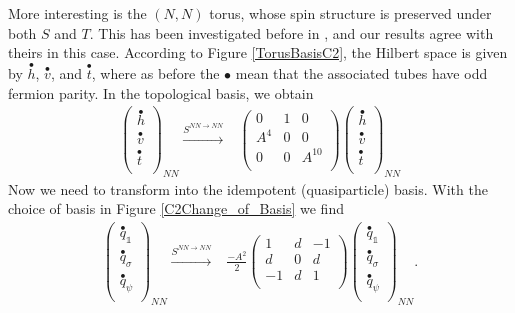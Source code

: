 \documentclass[12pt,a4paper]{article}
\newcounter{arrow}
\newcommand{\unit}{\mathds{1}}
\begin{document}
More interesting is the $(N,N)$ torus, whose spin structure is preserved under both $S$ and $T$. 
This has been investigated before in \cite{ware2016}, and our results agree with theirs in this case. 
According to Figure \ref{TorusBasisC2}, the Hilbert space is given by $\overset{\bullet}{h}$, $\overset{\bullet}{v}$, and $\overset{\bullet}{t}$,
where as before the $\bullet$ mean that the associated tubes have odd fermion parity.
In the topological basis, we obtain
\begin{align}
\left( \begin{matrix}
\overset{\bullet}{h}\\
\overset{\bullet}{v}\\
\overset{\bullet}{t}\\
\end{matrix} \right)_{NN} 
\xrightarrow{S^{NN \rightarrow NN}} & \left( \begin{matrix}
0&1&0\\
 A^4&0&0\\
0&0&A^{10}\\
\end{matrix} \right)
\left( \begin{matrix}
\overset{\bullet}{h}\\
\overset{\bullet}{v}\\
\overset{\bullet}{t}\\
\end{matrix} \right)_{NN}
\end{align}
Now we need to transform into the idempotent (quasiparticle) basis. 
With the choice of basis in Figure \ref{C2Change_of_Basis} we find
\begin{align}
\left( \begin{matrix}
\overset{\bullet}{q}_\unit\\
\overset{\bullet}{q}_\sigma\\
\overset{\bullet}{q}_\psi\\
\end{matrix} \right)_{NN} 
\xrightarrow{S^{NN \rightarrow NN}} &\frac{-A^2}{2} \left( \begin{matrix}
1& d&-1\\
d&0&d\\
-1& d&1\\
\end{matrix} \right)
\left( \begin{matrix}
\overset{\bullet}{q}_\unit\\
\overset{\bullet}{q}_\sigma\\
\overset{\bullet}{q}_\psi\\
\end{matrix} \right)_{NN}.
\label{NNSmatrix}
\end{align}
\end{document}
